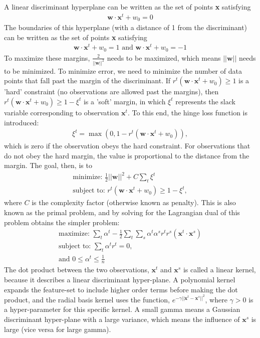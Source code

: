 \documentclass[tikz]{article}
\begin{document}
A linear discriminant hyperplane can be written as the set of points \textbf{x} satisfying \\
\begin{align*}
\mathbf{w} \cdot \mathbf{x}^{t} + w_{0} = 0
\end{align*}
The boundaries of this hyperplane (with a distance of 1 from the discriminant) can be written as the set of points \textbf{x} satisfying \\
\begin{align*}
\mathbf{w} \cdot \mathbf{x}^{t} + w_{0} = 1 \text{ and } \mathbf{w} \cdot \mathbf{x}^{t} + w_{0} = -1
\end{align*}
To maximize these margins, $\frac{2}{||\mathbf{w}||^{2}}$ needs to be maximized, which means $||\mathbf{w}||$ needs to be minimized. To minimize error, we need to minimize the number of data points that fall past the margin of the discriminant. If $r^{t}(\mathbf{w} \cdot \mathbf{x}^{t} + w_{0}) \geq 1$ is a 'hard' constraint (no observations are allowed past the margins), then $r^{t}(\mathbf{w} \cdot \mathbf{x}^{t} + w_{0}) \geq 1 - \xi^{t}$ is a 'soft' margin, in which $\xi^{t}$ represents the slack variable corresponding to observation $\mathbf{x}^{t}$. To this end, the hinge loss function is introduced:
\begin{align*}
\xi^{t} = \max(0, 1 - r^{t}(\mathbf{w} \cdot \mathbf{x}^{t} + w_{0})),
\end{align*}
which is zero if the observation obeys the hard constraint. For observations that do not obey the hard margin, the value is proportional to the distance from the margin. The goal, then, is to
\begin{align*} 
\text{minimize: } \frac{1}{2}||\mathbf{w}||^{2} + C\sum_{t} \xi^{t} \\
\text{subject to: } r^{t}(\mathbf{w} \cdot \mathbf{x}^{t} + w_{0}) \geq 1 - \xi^{t},
\end{align*}
where $C$ is the complexity factor (otherwise known as penalty). This is also known as the primal problem, and by solving for the Lagrangian dual of this problem obtains the simpler problem:
\begin{gather*}
\text{maximize: } \sum_{t}\alpha^{t} - \frac{1}{2}\sum_{t}\sum_{s}\alpha^{t}\alpha^{s}r^{t}r^{s}(\mathbf{x}^{t} \cdot \mathbf{x}^{s}) \\
\text{subject to: } \sum_{t}\alpha^{t}r^{t} = 0, \\ 
\text{and } 0 \leq \alpha^{t} \leq \frac{1}{n}
\end{gather*}
The dot product between the two observations, $\mathbf{x}^{t}$ and $\mathbf{x}^{s}$ is called a linear kernel, because it describes a linear discriminant hyper-plane. A polynomial kernel expands the feature-set to include higher order terms before making the dot product, and the radial basis kernel uses the function, $e^{-\gamma||\mathbf{x}^{t} - \mathbf{x}^{s}||^{2}}$, where $\gamma > 0$ is a hyper-parameter for this specific kernel. A small gamma means a Gaussian discriminant hyper-plane with a large variance, which means the influence of $\mathbf{x}^{s}$ is large (vice versa for large gamma).
\end{document}
